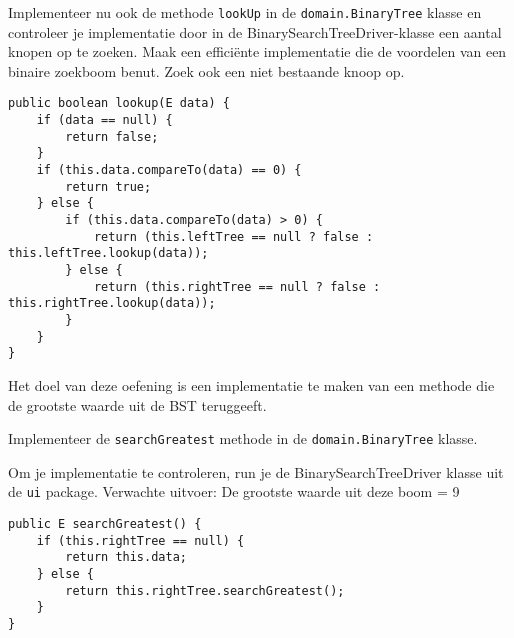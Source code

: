 \begin{oef}
\code Implementeer nu ook de methode \verb=lookUp= in de \verb=domain.BinaryTree= klasse en controleer je implementatie door in de BinarySearchTreeDriver-klasse een aantal knopen op te zoeken. Maak een efficiënte implementatie die de voordelen van een binaire zoekboom benut. Zoek ook een niet bestaande knoop op.
\begin{opl}
\begin{lstlisting}[caption={lookUp(data) methode}, label=bstlookUp]
public boolean lookup(E data) {
	if (data == null) {
		return false;
	}
	if (this.data.compareTo(data) == 0) {
		return true;
	} else {
		if (this.data.compareTo(data) > 0) {
			return (this.leftTree == null ? false : this.leftTree.lookup(data));
		} else {
			return (this.rightTree == null ? false : this.rightTree.lookup(data));
		}
	}
}
\end{lstlisting}
\end{opl}
	
\end{oef}





\begin{oef}
\code Het doel van deze oefening is een implementatie te maken van een methode die de grootste waarde uit de BST teruggeeft.
\begin{oefenumerate}
	\item Implementeer de \verb=searchGreatest= methode in de \verb=domain.BinaryTree= klasse.
	\item Om je implementatie te controleren, run je de BinarySearchTreeDriver klasse uit de \verb+ui+ package. Verwachte uitvoer: De grootste waarde uit deze boom = 9 
\end{oefenumerate}
\begin{opl}
\begin{lstlisting}[caption={searchGreatest methode}, label=bstsearchgreatest]
public E searchGreatest() {
	if (this.rightTree == null) {
		return this.data;
	} else {
		return this.rightTree.searchGreatest();
	}
}
 \end{lstlisting}

\end{opl}
\end{oef}




